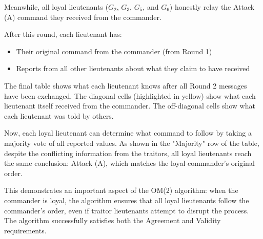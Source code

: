 \documentclass[11pt]{article}
\newcommand{\gen}[1]{\ensuremath{G_{#1}}}
\begin{document}
Meanwhile, all loyal lieutenants ($\gen{2}$, $\gen{3}$, $\gen{5}$, and $\gen{6}$) honestly relay the Attack (A) command they received from the commander.

After this round, each lieutenant has:
\begin{itemize}
    \item Their original command from the commander (from Round 1)
    \item Reports from all other lieutenants about what they claim to have received
\end{itemize}

The final table shows what each lieutenant knows after all Round 2 messages have been exchanged. The diagonal cells (highlighted in yellow) show what each lieutenant itself received from the commander. The off-diagonal cells show what each lieutenant was told by others.

Now, each loyal lieutenant can determine what command to follow by taking a majority vote of all reported values. As shown in the "Majority" row of the table, despite the conflicting information from the traitors, all loyal lieutenants reach the same conclusion: Attack (A), which matches the loyal commander's original order.

This demonstrates an important aspect of the OM(2) algorithm: when the commander is loyal, the algorithm ensures that all loyal lieutenants follow the commander's order, even if traitor lieutenants attempt to disrupt the process. The algorithm successfully satisfies both the Agreement and Validity requirements.

%
%

%
\end{document}
